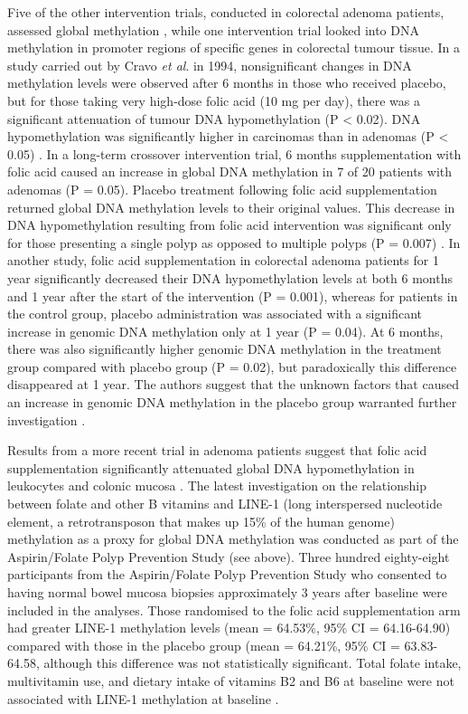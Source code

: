 \noindent Five of the other intervention trials, conducted in colorectal adenoma patients, assessed global methylation \cite{c253,c254,c255,c256,c257}, while one intervention trial looked into DNA methylation in promoter regions of specific genes \cite{c258} in colorectal tumour tissue. In a study carried out by Cravo \emph{et al}. in 1994, nonsignificant changes in DNA methylation levels were observed after 6 months in those who received placebo, but for those taking very high-dose folic acid (10 mg per day), there was a significant attenuation of tumour DNA hypomethylation (P < 0.02). DNA hypomethylation was significantly higher in carcinomas than in adenomas (P < 0.05) \cite{c253}. In a long-term crossover intervention trial, 6 months supplementation with folic acid caused an increase in global DNA methylation in 7 of 20 patients with adenomas (P = 0.05). Placebo treatment following folic acid supplementation returned global DNA methylation levels to their original values. This decrease in DNA hypomethylation resulting from folic acid intervention was significant only for those presenting a single polyp as opposed to multiple polyps (P = 0.007) \cite{c254}. In another study, folic acid supplementation in colorectal adenoma patients for 1 year significantly decreased their DNA hypomethylation levels at both 6 months and 1 year after the start of the intervention (P = 0.001), whereas for patients in the control group, placebo administration was associated with a significant increase in genomic DNA methylation only at 1 year (P = 0.04). At 6 months, there was also significantly higher genomic DNA methylation in the treatment group compared with placebo group (P = 0.02), but paradoxically this difference disappeared at 1 year. The authors suggest that the unknown factors that caused an increase in genomic DNA methylation in the placebo group warranted further investigation \cite{c255}. 
 
\noindent Results from a more recent trial in adenoma patients suggest that folic acid supplementation significantly attenuated global DNA hypomethylation in leukocytes and colonic mucosa \cite{c256}. The latest investigation on the relationship between folate and other B vitamins and LINE-1 (long interspersed nucleotide element, a retrotransposon that makes up 15\% of the human genome) methylation as a proxy for global DNA methylation was conducted as part of the Aspirin/Folate Polyp Prevention Study (see above). Three hundred eighty-eight participants from the Aspirin/Folate Polyp Prevention Study who consented to having normal bowel mucosa biopsies approximately 3 years after baseline were included in the analyses. Those randomised to the folic acid supplementation arm had greater LINE-1 methylation levels (mean = 64.53\%, 95\% CI = 64.16-64.90) compared with those in the placebo group (mean = 64.21\%, 95\% CI = 63.83-64.58, although this difference was not statistically significant. Total folate intake, multivitamin use, and dietary intake of vitamins B2 and B6 at baseline were not associated with LINE-1 methylation at baseline \cite{c257}. 

